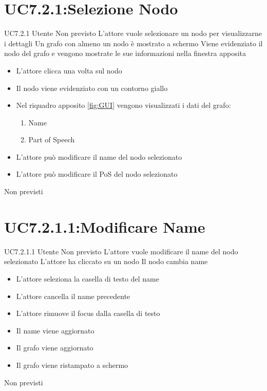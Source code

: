\documentclass[../AnalisideiRequisiti.tex]{subfiles}
\begin{document}
\section{UC7.2.1:Selezione Nodo}
\UserCase
{UC7.2.1}
{Utente}
{Non previsto}
{L'attore vuole selezionare un nodo per visualizzarne i dettagli}
{Un grafo con almeno un nodo è mostrato a schermo}
{Viene evidenziato il nodo del grafo e vengono mostrate le sue informazioni nella finestra apposita}
{
	\begin{itemize}
		\item{} L'attore clicca una volta sul nodo
		\item{} Il nodo viene evidenziato con un contorno giallo
		\item{} Nel riquadro apposito \ref{fig:GUI} vengono visualizzati i dati del grafo:
		\begin{enumerate}
			\item{} Name
			\item{} Part of Speech
		\end{enumerate}
		\item{} L'attore può modificare il name del nodo selezionato 
		\item{} L'attore può modificare il PoS del nodo selezionato  
	\end{itemize}
}
{Non previsti}

\section{UC7.2.1.1:Modificare Name}
\UserCase
{UC7.2.1.1}
{Utente}
{Non previsto}
{L'attore vuole modificare il name del nodo selezionato}
{L'attore ha cliccato su un nodo }
{Il nodo cambia name}
{
	\begin{itemize}
		\item{} L'attore seleziona la casella di testo del name
		\item{} L'attore cancella il name precedente
		\item{} L'attore rimuove il focus dalla casella di testo
		\item{} Il name viene aggiornato
		\item{} Il grafo viene aggiornato 
		\item{} Il grafo viene ristampato a schermo 
	\end{itemize}
}
{Non previsti}
\end{document}
